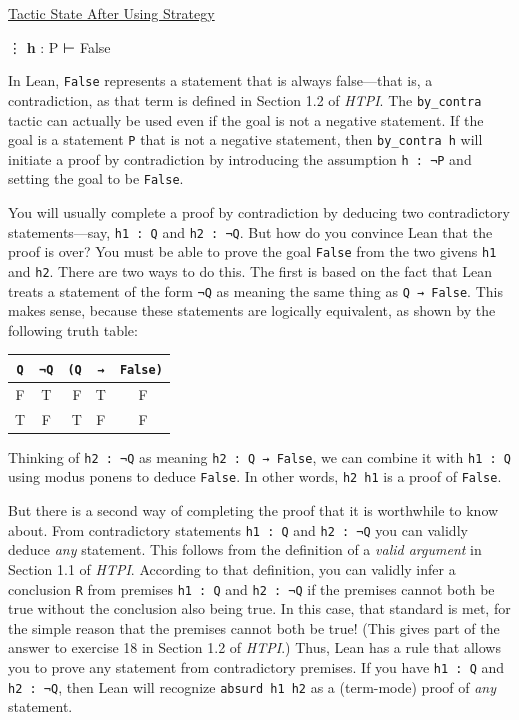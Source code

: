 \documentclass[
  letterpaper,
  DIV=11,
  numbers=noendperiod]{scrreprt}
\newenvironment{Shaded}{\begin{snugshade}}{\end{snugshade}}
\newcommand{\InformationTok}[1]{\textcolor[rgb]{0.37,0.37,0.37}{#1}}
\newcommand{\NormalTok}[1]{\textcolor[rgb]{0.00,0.23,0.31}{#1}}
\newcommand{\SpecialCharTok}[1]{\textcolor[rgb]{0.37,0.37,0.37}{#1}}
\renewcommand{\NormalTok}[1]{\textcolor[HTML]{000000}{#1}}
\renewcommand{\SpecialCharTok}[1]{}
\renewcommand{\InformationTok}[1]{\textcolor[HTML]{D2691E}{\textbf{#1}}}
\newcommand{\nobreakShaded}{\renewenvironment{Shaded}
	{\begin{tcolorbox}[frame hidden, enhanced, interior hidden, boxrule=0pt,
		borderline west={3pt}{0pt}{shadecolor}, sharp corners]}
	{\end{tcolorbox}}}
\newenvironment{aft}
	{\nobreakShaded\begin{minipage}[t]{0.475\textwidth}
		\uline{Tactic State After Using Strategy}}
	{\end{minipage}}
\newcommand{\excl}[1]{}
\theoremstyle{remark}
\begin{document}
\begin{aft}

\begin{Shaded}
\begin{Highlighting}[]
\SpecialCharTok{!!}\NormalTok{ ⋮}
\InformationTok{h }\NormalTok{: P}
\NormalTok{⊢ False}
\end{Highlighting}
\end{Shaded}

\end{aft}

In Lean, \texttt{False} represents a statement that is always
false---that is, a contradiction, as that term is defined in Section 1.2
of \emph{HTPI}. The \texttt{by\_contra} tactic can actually be used even
if the goal is not a negative statement. If the goal is a statement
\texttt{P} that is not a negative statement, then \texttt{by\_contra\ h}
will initiate a proof by contradiction by introducing the assumption
\texttt{h\ :\ ¬P} and setting the goal to be \texttt{False}.

You will usually complete a proof by contradiction by deducing two
contradictory statements---say, \texttt{h1\ :\ Q} and
\texttt{h2\ :\ ¬Q}. But how do you convince Lean that the proof is over?
You must be able to prove the goal \texttt{False} from the two givens
\texttt{h1} and \texttt{h2}. There are two ways to do this. The first is
based on the fact that Lean treats a statement of the form \texttt{¬Q}
as meaning the same thing as \texttt{Q\ →\ False}. This makes sense,
because these statements are logically equivalent, as shown by the
following truth table:

\begin{longtable}[]{@{}ccrcl@{}}
\toprule()
\texttt{Q} & \texttt{¬Q} & \texttt{(Q} & \texttt{→} & \texttt{False)} \\
\midrule()
\endhead
F & T & F & T & ~~\excl{~} F \\
T & F & T & F & ~~\excl{~} F \\
\bottomrule()
\end{longtable}

Thinking of \texttt{h2\ :\ ¬Q} as meaning \texttt{h2\ :\ Q\ →\ False},
we can combine it with \texttt{h1\ :\ Q} using modus ponens to deduce
\texttt{False}. In other words, \texttt{h2\ h1} is a proof of
\texttt{False}.

But there is a second way of completing the proof that it is worthwhile
to know about. From contradictory statements \texttt{h1\ :\ Q} and
\texttt{h2\ :\ ¬Q} you can validly deduce \emph{any} statement. This
follows from the definition of a \emph{valid argument} in Section 1.1 of
\emph{HTPI}. According to that definition, you can validly infer a
conclusion \texttt{R} from premises \texttt{h1\ :\ Q} and
\texttt{h2\ :\ ¬Q} if the premises cannot both be true without the
conclusion also being true. In this case, that standard is met, for the
simple reason that the premises cannot both be true! (This gives part of
the answer to exercise 18 in Section 1.2 of \emph{HTPI}.) Thus, Lean has
a rule that allows you to prove any statement from contradictory
premises. If you have \texttt{h1\ :\ Q} and \texttt{h2\ :\ ¬Q}, then
Lean will recognize \texttt{absurd\ h1\ h2} as a (term-mode) proof of
\emph{any} statement.
\end{document}
